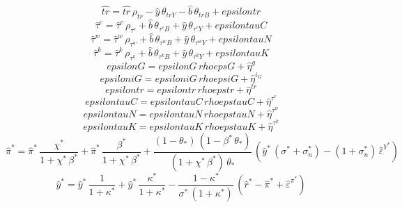 \begin{dmath}
{\hat{tr}}={\hat{tr}}\, {\rho_{tr}}-{\hat{y}}\, {\theta_{trY}}-{\hat{b}}\, {\theta_{trB}}+{epsilontr}
\end{dmath}
\begin{dmath}
{\hat{\tau}^c}={\hat{\tau}^c}\, {\rho_{\tau^c}}+{\hat{b}}\, {\theta_{\tau^cB}}+{\hat{y}}\, {\theta_{\tau^cY}}+{epsilontauC}
\end{dmath}
\begin{dmath}
{\hat{\tau}^w}={\hat{\tau}^w}\, {\rho_{\tau^w}}+{\hat{b}}\, {\theta_{\tau^wB}}+{\hat{y}}\, {\theta_{\tau^wY}}+{epsilontauN}
\end{dmath}
\begin{dmath}
{\hat{\tau}^k}={\hat{\tau}^k}\, {\rho_{\tau^k}}+{\hat{b}}\, {\theta_{\tau^kB}}+{\hat{y}}\, {\theta_{\tau^kY}}+{epsilontauK}
\end{dmath}
\begin{dmath}
{epsilonG}={epsilonG}\, {rhoepsG}+{\hat{\eta}^{g}}
\end{dmath}
\begin{dmath}
{epsiloniG}={epsiloniG}\, {rhoepsiG}+{\hat{\eta}^{i_G}}
\end{dmath}
\begin{dmath}
{epsilontr}={epsilontr}\, {rhoepstr}+{\hat{\eta}^{tr}}
\end{dmath}
\begin{dmath}
{epsilontauC}={epsilontauC}\, {rhoepstauC}+{\hat{\eta}^{\tau^c}}
\end{dmath}
\begin{dmath}
{epsilontauN}={epsilontauN}\, {rhoepstauN}+{\hat{\eta}^{\tau^w}}
\end{dmath}
\begin{dmath}
{epsilontauK}={epsilontauK}\, {rhoepstauK}+{\hat{\eta}^{\tau^k}}
\end{dmath}
\begin{dmath}
{\hat{\pi}^*}={\hat{\pi}^*}\, \frac{{\chi^*}}{1+{\chi^*}\, {\beta^*}}+{\hat{\pi}^*}\, \frac{{\beta^*}}{1+{\chi^*}\, {\beta^*}}+\frac{\left(1-{\theta_*}\right)\, \left(1-{\beta^*}\, {\theta_*}\right)}{\left(1+{\chi^*}\, {\beta^*}\right)\, {\theta_*}}\, \left({\hat{y}^*}\, \left({\sigma^*}+{\sigma^*_n}\right)-\left(1+{\sigma^*_n}\right)\, {\hat{\varepsilon}^{Y^*}}\right)
\end{dmath}
\begin{dmath}
{\hat{y}^*}={\hat{y}^*}\, \frac{1}{1+{\kappa^*}}+{\hat{y}^*}\, \frac{{\kappa^*}}{1+{\kappa^*}}-\frac{1-{\kappa^*}}{{\sigma^*}\, \left(1+{\kappa^*}\right)}\, \left({\hat{r}^*}-{\hat{\pi}^*}+{\hat{\varepsilon}^{\pi^*}}\right)
\end{dmath}
